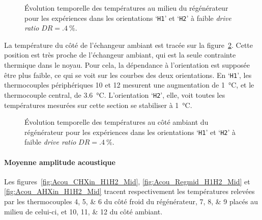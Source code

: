 \begin{figure}[!ht]
    \centering
    
    \caption{\'Evolution temporelle des températures au milieu du régénérateur pour les expériences dans les orientations `\texttt{H1}' et `\texttt{H2}' à faible \textit{drive ratio} $DR=\qty{.4}{\percent}$.}
    \label{fig:Acou_Regmid_H1H2_Low}
\end{figure}

La température du côté de l'échangeur ambiant est tracée sur la figure~\ref{fig:Acou_AHXin_H1H2_Low}. Cette position est très proche de l'échangeur ambiant, qui est la seule contrainte thermique dans le noyau. Pour cela, la dépendance à l'orientation est supposée être plus faible, ce qui se voit sur les courbes des deux orientations. En `\texttt{H1}', les thermocouples périphériques 10 et 12 mesurent une augmentation de \qty{1}{\degreeCelsius}, et le thermocouple central, de \qty{3.6}{\degreeCelsius}. L'orientation `\texttt{H2}', elle, voit toutes les températures mesurées sur cette section se stabiliser à \qty{1}{\degreeCelsius}.

\begin{figure}[!ht]
    \centering
    
    \caption{\'Evolution temporelle des températures au côté ambiant du régénérateur pour les expériences dans les orientations `\texttt{H1}' et `\texttt{H2}' à faible \textit{drive ratio} $DR=\qty{.4}{\percent}$.}
    \label{fig:Acou_AHXin_H1H2_Low}
\end{figure}

\paragraph{Moyenne amplitude acoustique}
Les figures~\ref{fig:Acou_CHXin_H1H2_Mid}, \ref{fig:Acou_Regmid_H1H2_Mid} et \ref{fig:Acou_AHXin_H1H2_Mid} tracent respectivement les températures relevées par les thermocouples \numlist{4;5;6} du côté froid du régénérateur, \numlist{7;8;9} placés au milieu de celui-ci, et \numlist{10;11;12} du côté ambiant.


